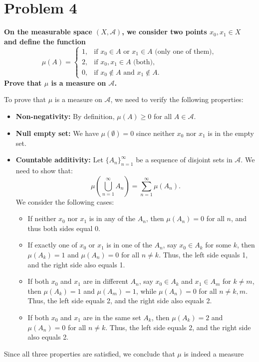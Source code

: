 \documentclass[11pt]{article}
\begin{document}
\section*{Problem 4}
\textbf{\large On the measurable space \((X, \mathcal{A})\), we consider two points \(x_0, x_1 \in X\) and define the function
\[\mu(A) = \begin{cases}
1, & \text{if } x_0 \in A \text{ or } x_1 \in A \text{ (only one of them)}, \\
2, & \text{if } x_0, x_1 \in A  \text{ (both)}, \\
0, & \text{if } x_0 \notin A \text{ and } x_1 \notin A.
\end{cases}\]
Prove that \(\mu\) is a measure on \(\mathcal{A}\).}

To prove that \(\mu\) is a measure on \(\mathcal{A}\), we need to verify the following properties:
\begin{itemize}
    \item \textbf{Non-negativity:} By definition, \(\mu(A) \geq 0\) for all \(A \in \mathcal{A}\).
    \item \textbf{Null empty set:} We have \(\mu(\emptyset) = 0\) since neither \(x_0\) nor \(x_1\) is in the empty set.
    \item \textbf{Countable additivity:} Let \(\{A_n\}_{n=1}^{\infty}\) be a sequence of disjoint sets in \(\mathcal{A}\). We need to show that:
    \[\mu\left(\bigcup_{n=1}^{\infty} A_n\right) = \sum_{n=1}^{\infty} \mu(A_n).\]
    We consider the following cases:
    \begin{itemize}
        \item If neither \(x_0\) nor \(x_1\) is in any of the \(A_n\), then \(\mu(A_n) = 0\) for all \(n\), and thus both sides equal 0.
        \item If exactly one of \(x_0\) or \(x_1\) is in one of the \(A_n\), say \(x_0 \in A_k\) for some \(k\), then \(\mu(A_k) = 1\) and \(\mu(A_n) = 0\) for all \(n \neq k\). Thus, the left side equals 1, and the right side also equals 1.
        \item If both \(x_0\) and \(x_1\) are in different \(A_n\), say \(x_0 \in A_k\) and \(x_1 \in A_m\) for \(k \neq m\), then \(\mu(A_k) = 1\) and \(\mu(A_m) = 1\), while \(\mu(A_n) = 0\) for all \(n \neq k, m\). Thus, the left side equals 2, and the right side also equals 2.
        \item If both \(x_0\) and \(x_1\) are in the same set \(A_k\), then \(\mu(A_k) = 2\) and \(\mu(A_n) = 0\) for all \(n \neq k\). Thus, the left side equals 2, and the right side also equals 2.
    \end{itemize}
\end{itemize}
Since all three properties are satisfied, we conclude that \(\mu\) is indeed a measure
\pagebreak
\end{document}
